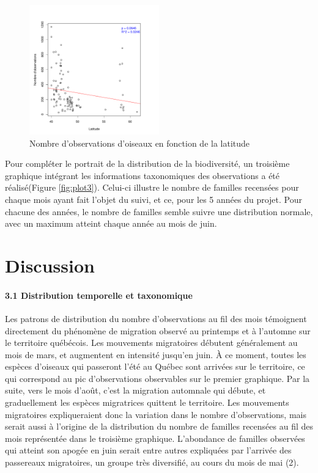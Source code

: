 \documentclass[9pt,twocolumn,twoside,]{pnas-new}
\begin{document}
\begin{figure}
\centering
\includegraphics[width=0.5\textwidth,height=0.4\textheight]{../figures/observation_lat.pdf}
\caption{Nombre d'observations d'oiseaux en fonction de la
latitude\label{fig:plot2}}
\end{figure}

Pour compléter le portrait de la distribution de la biodiversité, un
troisième graphique intégrant les informations taxonomiques des
observations a été réalisé(Figure \ref{fig:plot3}). Celui-ci illustre le
nombre de familles recensées pour chaque mois ayant fait l'objet du
suivi, et ce, pour les 5 années du projet. Pour chacune des années, le
nombre de familles semble suivre une distribution normale, avec un
maximum atteint chaque année au mois de juin.

\hypertarget{discussion}{%
\section{Discussion}\label{discussion}}

\hypertarget{distribution-temporelle-et-taxonomique}{%
\paragraph{3.1 Distribution temporelle et
taxonomique}\label{distribution-temporelle-et-taxonomique}}

\hfill\break
Les patrons de distribution du nombre d'observations au fil des mois
témoignent directement du phénomène de migration observé au printemps et
à l'automne sur le territoire québécois. Les mouvements migratoires
débutent généralement au mois de mars, et augmentent en intensité
jusqu'en juin. À ce moment, toutes les espèces d'oiseaux qui passeront
l'été au Québec sont arrivées sur le territoire, ce qui correspond au
pic d'observations observables sur le premier graphique. Par la suite,
vers le mois d'août, c'est la migration automnale qui débute, et
graduellement les espèces migratrices quittent le territoire. Les
mouvements migratoires expliqueraient donc la variation dans le nombre
d'observations, mais serait aussi à l'origine de la distribution du
nombre de familles recensées au fil des mois représentée dans le
troisième graphique. L'abondance de familles observées qui atteint son
apogée en juin serait entre autres expliquées par l'arrivée des
passereaux migratoires, un groupe très diversifié, au cours du mois de
mai (2).
\end{document}
